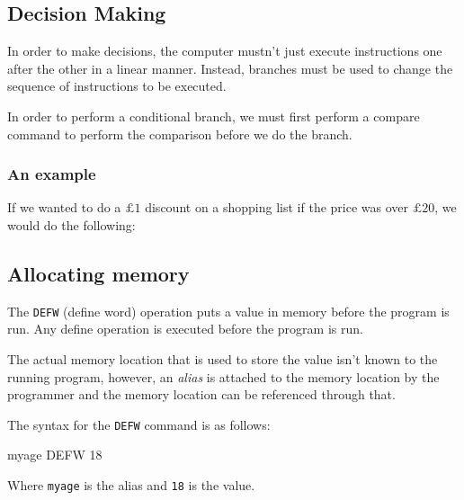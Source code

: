 \documentclass{article}
\begin{document}
\subsection{Decision Making}

In order to make decisions, the computer mustn't just execute instructions one after the other in a linear manner. Instead, branches must be used to change the sequence of instructions to be executed.

In order to perform a conditional branch, we must first perform a compare command to perform the comparison before we do the branch.

\subsubsection{An example}

If we wanted to do a $£1$ discount on a shopping list if the price was over $£20$, we would do the following:


\subsection{Allocating memory}

The \texttt{DEFW} (define word) operation puts a value in memory before the program is run. Any define operation is executed before the program is run.

The actual memory location that is used to store the value isn't known to the running program, however, an {\it alias} is attached to the memory location by the programmer and the memory location can be referenced through that.

The syntax for the \texttt{DEFW} command is as follows:

\begin{listing}{1}
myage	DEFW	18
\end{listing}

Where {\tt myage} is the alias and {\tt 18} is the value.
\end{document}
